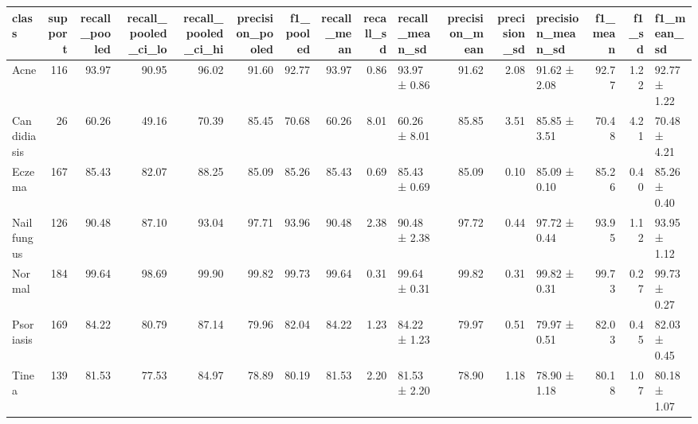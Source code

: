\begin{tabular}{lrrrrrrrrlrrlrrl}
\toprule
class & support & recall\_pooled & recall\_pooled\_ci\_lo & recall\_pooled\_ci\_hi & precision\_pooled & f1\_pooled & recall\_mean & recall\_sd & recall\_mean\_sd & precision\_mean & precision\_sd & precision\_mean\_sd & f1\_mean & f1\_sd & f1\_mean\_sd \\
\midrule
Acne & 116 & 93.97 & 90.95 & 96.02 & 91.60 & 92.77 & 93.97 & 0.86 & 93.97 ± 0.86 & 91.62 & 2.08 & 91.62 ± 2.08 & 92.77 & 1.22 & 92.77 ± 1.22 \\
Candidiasis & 26 & 60.26 & 49.16 & 70.39 & 85.45 & 70.68 & 60.26 & 8.01 & 60.26 ± 8.01 & 85.85 & 3.51 & 85.85 ± 3.51 & 70.48 & 4.21 & 70.48 ± 4.21 \\
Eczema & 167 & 85.43 & 82.07 & 88.25 & 85.09 & 85.26 & 85.43 & 0.69 & 85.43 ± 0.69 & 85.09 & 0.10 & 85.09 ± 0.10 & 85.26 & 0.40 & 85.26 ± 0.40 \\
Nail fungus & 126 & 90.48 & 87.10 & 93.04 & 97.71 & 93.96 & 90.48 & 2.38 & 90.48 ± 2.38 & 97.72 & 0.44 & 97.72 ± 0.44 & 93.95 & 1.12 & 93.95 ± 1.12 \\
Normal & 184 & 99.64 & 98.69 & 99.90 & 99.82 & 99.73 & 99.64 & 0.31 & 99.64 ± 0.31 & 99.82 & 0.31 & 99.82 ± 0.31 & 99.73 & 0.27 & 99.73 ± 0.27 \\
Psoriasis & 169 & 84.22 & 80.79 & 87.14 & 79.96 & 82.04 & 84.22 & 1.23 & 84.22 ± 1.23 & 79.97 & 0.51 & 79.97 ± 0.51 & 82.03 & 0.45 & 82.03 ± 0.45 \\
Tinea & 139 & 81.53 & 77.53 & 84.97 & 78.89 & 80.19 & 81.53 & 2.20 & 81.53 ± 2.20 & 78.90 & 1.18 & 78.90 ± 1.18 & 80.18 & 1.07 & 80.18 ± 1.07 \\
\bottomrule
\end{tabular}
